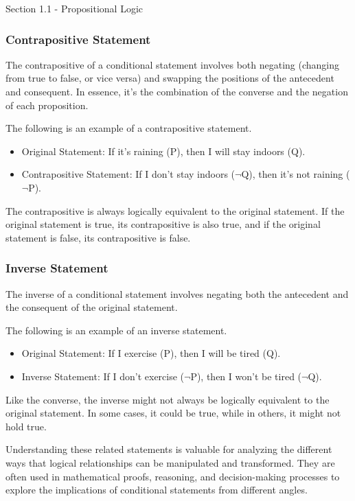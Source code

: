 \begin{notes}{Section 1.1 - Propositional Logic}
    \subsubsection*{Contrapositive Statement}

    The contrapositive of a conditional statement involves both negating (changing from true to false, or vice versa) and swapping the positions of the antecedent and consequent. In essence, it's the combination of the converse 
    and the negation of each proposition.

    \begin{highlight}
        The following is an example of a contrapositive statement.

        \begin{itemize}
            \item Original Statement: If it's raining (P), then I will stay indoors (Q).
            \item Contrapositive Statement: If I don't stay indoors ($\neg$Q), then it's not raining ($\neg$P).
        \end{itemize}

        The contrapositive is always logically equivalent to the original statement. If the original statement is true, its contrapositive is also true, and if the original statement is false, its contrapositive is false.
    \end{highlight}

    \subsubsection*{Inverse Statement}

    The inverse of a conditional statement involves negating both the antecedent and the consequent of the original statement.

    \begin{highlight}
        The following is an example of an inverse statement.

        \begin{itemize}
            \item Original Statement: If I exercise (P), then I will be tired (Q).
            \item Inverse Statement: If I don't exercise ($\neg$P), then I won't be tired ($\neg$Q).
        \end{itemize}

        Like the converse, the inverse might not always be logically equivalent to the original statement. In some cases, it could be true, while in others, it might not hold true.
    \end{highlight}

    Understanding these related statements is valuable for analyzing the different ways that logical relationships can be manipulated and transformed. They are often used in mathematical proofs, reasoning, and decision-making 
    processes to explore the implications of conditional statements from different angles.
\end{notes}

